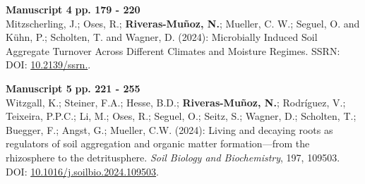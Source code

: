 \vspace{\baselineskip}

\noindent
\textbf{Manuscript 4} \hfill \textbf{pp. 179 - 220} \\ %
Mitzscherling, J.; Oses, R.; \textbf{Riveras-Muñoz, N.}; Mueller, C. W.; Seguel, O. and Kühn, P.; Scholten, T. and Wagner, D. (2024): Microbially Induced Soil Aggregate Turnover Across Different Climates and Moisture Regimes. SSRN: DOI: \href{https://doi.org/10.2139/ssrn.4740477}{10.2139/\allowbreak ssrn.}.

\vspace{\baselineskip}

\noindent
\textbf{Manuscript 5} \hfill \textbf{pp. 221 - 255} \\ %
Witzgall, K.; Steiner, F.A.; Hesse, B.D.; \textbf{Riveras-Muñoz, N.}; Rodríguez, V.; Teixeira, P.P.C.; Li, M.; Oses, R.; Seguel, O.; Seitz, S.; Wagner, D.; Scholten, T.; Buegger, F.; Angst, G.; Mueller, C.W. (2024): Living and decaying roots as regulators of soil aggregation and organic matter formation---from the rhizosphere to the detritusphere. \textit{Soil Biology and Biochemistry}, 197, 109503. DOI: \href{https://doi.org/10.1016/j.soilbio.2024.109503}{10.1016/j.soilbio.2024.109503}.


\cleardoublepage %

